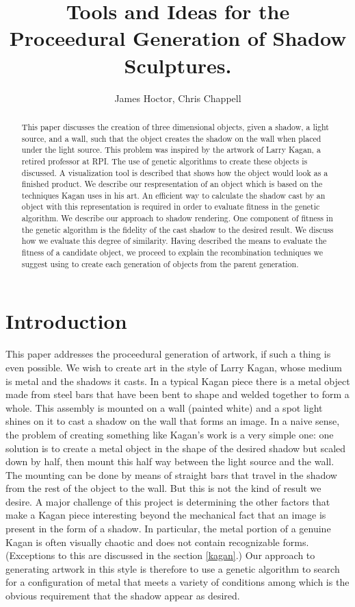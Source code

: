 \documentclass[10pt]{article}
\title{Tools and Ideas for the Proceedural Generation of Shadow Sculptures.}
\author{James Hoctor, Chris Chappell}
\begin{document}
\maketitle


\begin{abstract}
This paper discusses the creation of three dimensional objects,
given a shadow, a light source, and a wall, such that the object
creates the shadow on the wall when placed under the light source.
This problem was inspired by the artwork of Larry Kagan, a retired
professor at RPI. The use of genetic
algorithms to create these objects is discussed. A visualization
tool is described that shows how the object would look as a finished
product. We describe our respresentation of an object which is based
on the techniques Kagan uses in his art. An efficient way to
calculate the shadow cast by an object with this representation is
required in order to evaluate fitness in the genetic algorithm. We
describe our approach to shadow rendering. One component of fitness
in the genetic algorithm is the fidelity of the cast shadow to the
desired result. We discuss how we evaluate this degree of similarity.
Having described the means to evaluate the fitness of a
candidate object, we proceed to explain the recombination techniques
we suggest using to create each generation of objects from the parent generation.
\end{abstract}

\section*{Introduction}
This paper addresses the proceedural generation of artwork, if such
a thing is even possible. We wish to create art in the style of
Larry Kagan, whose medium is metal and the shadows it casts. In a
typical Kagan piece there is a metal object made from steel bars
that have been bent to shape and welded together to form a whole.
This assembly is mounted on a wall (painted white) and a spot light
shines on it to cast a shadow on the wall that forms an image. In a
naive sense, the problem  of creating something like Kagan's work is
a very simple one: one solution is to create a metal object in the shape of the desired
shadow but scaled down by half, then mount this half way between the
light source and the wall. The mounting can be done by means of
straight bars that travel in the shadow from the rest of the object
to the wall. But this is not the kind of result we desire. A major
challenge of this project is determining the other factors that make
a Kagan piece interesting beyond the mechanical fact that an image
is present in the form of a shadow. In particular, the metal portion
of a genuine Kagan is often visually chaotic and does not contain
recognizable forms. (Exceptions to this are discussed in the section
\ref{kagan}.) Our approach to generating artwork in this style
is therefore to use a genetic algorithm to search for a configuration
of metal that meets a variety of conditions among which is the
obvious requirement that the shadow appear as desired.
\end{document}
